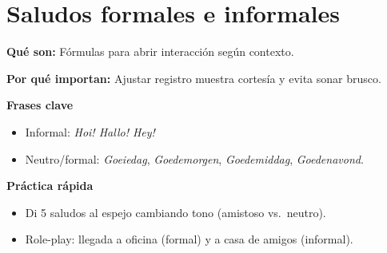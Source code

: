 \section{Saludos formales e informales}
\textbf{Qué son:} Fórmulas para abrir interacción según contexto.

\textbf{Por qué importan:} Ajustar registro muestra cortesía y evita sonar brusco.

\textbf{Frases clave}
\begin{itemize}[leftmargin=*]
  \item Informal: \textit{Hoi! Hallo! Hey!}
  \item Neutro/formal: \textit{Goeiedag}, \textit{Goedemorgen}, \textit{Goedemiddag}, \textit{Goedenavond}.
\end{itemize}

\textbf{Práctica rápida}
\begin{itemize}[leftmargin=*]
  \item Di 5 saludos al espejo cambiando tono (amistoso vs.\ neutro).
  \item Role-play: llegada a oficina (formal) y a casa de amigos (informal).
\end{itemize}
